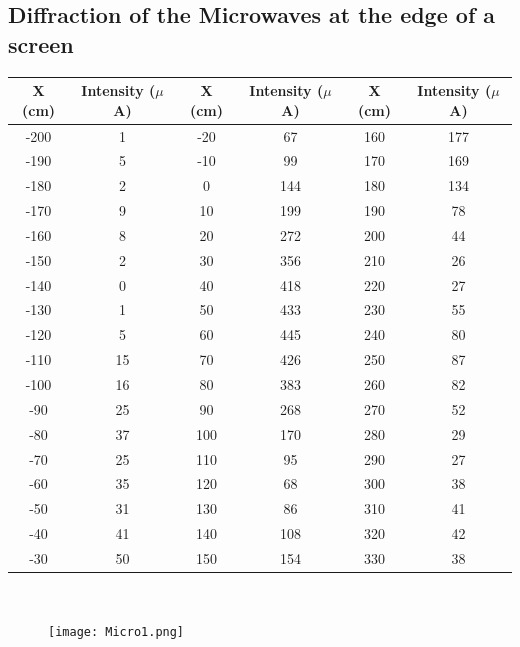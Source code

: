 \documentclass[12pt]{report}
\begin{document}
\subsection{Diffraction of the Microwaves at the edge of a screen}
\begin{center}
	\begin{tabular}{ |c|c|c|c|c|c| } 
		\hline
		X (cm) & Intensity ($\mu$A) & X (cm) & Intensity ($\mu$A) & X (cm) & Intensity ($\mu$A)\\ 
		\hline
		-200 & 1  & -20 & 67  & 160 & 177 \\
		-190 & 5  & -10 & 99  & 170 & 169 \\
		-180 & 2  & 0   & 144 & 180 & 134 \\
		-170 & 9  & 10  & 199 & 190 & 78  \\
		-160 & 8  & 20  & 272 & 200 & 44  \\
		-150 & 2  & 30  & 356 & 210 & 26  \\
		-140 & 0  & 40  & 418 & 220 & 27  \\
		-130 & 1  & 50  & 433 & 230 & 55  \\
		-120 & 5  & 60  & 445 & 240 & 80  \\
		-110 & 15 & 70  & 426 & 250 & 87  \\
		-100 & 16 & 80  & 383 & 260 & 82  \\
		-90  & 25 & 90  & 268 & 270 & 52  \\
		-80  & 37 & 100 & 170 & 280 & 29  \\
		-70  & 25 & 110 & 95  & 290 & 27  \\
		-60  & 35 & 120 & 68  & 300 & 38  \\
		-50  & 31 & 130 & 86  & 310 & 41  \\
		-40  & 41 & 140 & 108 & 320 & 42  \\
		-30  & 50 & 150 & 154 & 330 & 38  \\
		\hline
	\end{tabular}
\\
\end{center}

\begin{figure}[h!]
	\centering
	\texttt{[image: Micro1.png]}
\end{figure}

\newpage
\end{document}

